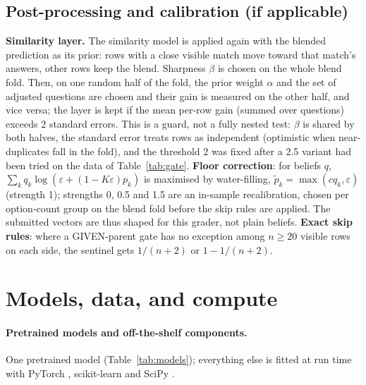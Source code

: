 \documentclass{article}
\begin{document}
\subsection{Post-processing and calibration (if applicable)}
\label{sec:post}
\textbf{Similarity layer.} The similarity model is applied again with the blended prediction as its prior: rows with a close visible match move toward that match's answers, other rows keep the blend. Sharpness $\beta$ is chosen on the whole blend fold. Then, on one random half of the fold, the prior weight $\alpha$ and the set of adjusted questions are chosen and their gain is measured on the other half, and vice versa; the layer is kept if the mean per-row gain (summed over questions) exceeds 2 standard errors. This is a guard, not a fully nested test: $\beta$ is shared by both halves, the standard error treats rows as independent (optimistic when near-duplicates fall in the fold), and the threshold 2 was fixed after a 2.5 variant had been tried on the data of Table~\ref{tab:gate}. \textbf{Floor correction}: for beliefs $q$, $\sum_k q_k\log(\varepsilon+(1-K\varepsilon)p_k)$ is maximised by water-filling, $\tilde p_k=\max(cq_k,\varepsilon)$ (strength 1); strengths 0, 0.5 and 1.5 are an in-sample recalibration, chosen per option-count group on the blend fold before the skip rules are applied. The submitted vectors are thus shaped for this grader, not plain beliefs. \textbf{Exact skip rules}: where a GIVEN-parent gate has no exception among $n\ge20$ visible rows on each side, the sentinel gets $1/(n+2)$ or $1-1/(n+2)$.

\section{Models, data, and compute}
\label{sec:resources}

\paragraph{Pretrained models and off-the-shelf components.} One pretrained model (Table~\ref{tab:models}); everything else is fitted at run time with PyTorch \citep{paszke2019pytorch}, scikit-learn and SciPy \citep{virtanen2020scipy}.
\end{document}
